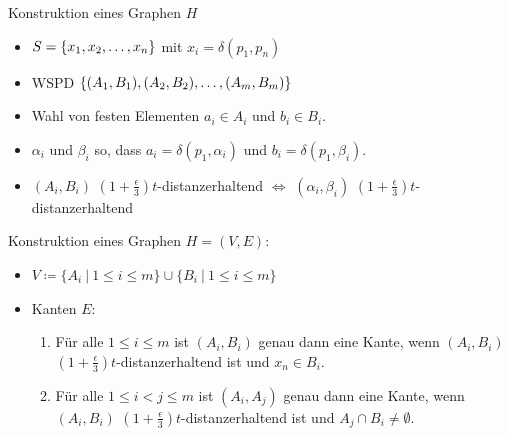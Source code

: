 \documentclass{beamer}
\begin{document}
	\begin{frame}[t]{Konstruktion eines Graphen $H$}
		\begin{block}{}
			\begin{itemize}
				\item $S = \{x_1, x_2, \mathellipsis, x_n\}$ mit $x_i = \delta(p_1, p_n)$
				\item WSPD $\{(A_1, B_1), (A_2, B_2), \mathellipsis, (A_m, B_m)\}$
			\end{itemize}
		\end{block}
		\begin{itemize}
			\item<1-> Wahl von festen Elementen $a_i \in A_i$ und $b_i \in B_i$.
			\item<1-> $\alpha_i$ und $\beta_i$ so, dass $a_i = \delta(p_1, \alpha_i)$ und $b_i = \delta(p_1, \beta_i)$.
			\item<2-> $(A_i, B_i)$ $(1 + \frac{\epsilon}{3})t$-distanzerhaltend $\Leftrightarrow$ $(\alpha_i, \beta_i)$ $(1 + \frac{\epsilon}{3})t$-distanzerhaltend
		\end{itemize}

		
		Konstruktion eines Graphen $H = (V, E)$:
		\begin{itemize}
			\item<3-> $V \coloneqq \{A_i\ |\ 1 \leq i \leq m\} \cup \{B_i\ |\ 1\leq i \leq m\}$
			\item<4-> Kanten $E$:
			\begin{enumerate}
				\item Für alle $1 \leq i \leq m$ ist $(A_i, B_i)$ genau dann eine Kante, wenn $(A_i, B_i)$ $(1 + \frac{\epsilon}{3})t$-distanzerhaltend ist und $x_n \in B_i$.
				\item Für alle $1\leq i < j \leq m$ ist $(A_i, A_j)$ genau dann eine Kante, wenn $(A_i, B_i)$ $(1 + \frac{\epsilon}{3})t$-distanzerhaltend ist und $A_j \cap B_i \neq \emptyset$.
			\end{enumerate}
		\end{itemize}
	\end{frame}
	
\end{document}
